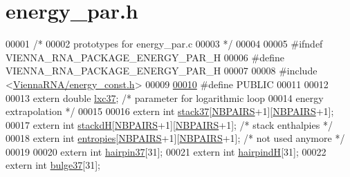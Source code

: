 \hypertarget{energy__par_8h_source}{}\section{energy\+\_\+par.\+h}
\label{energy__par_8h_source}

\begin{DoxyCode}
00001 \textcolor{comment}{/*}
00002 \textcolor{comment}{   prototypes for energy\_par.c}
00003 \textcolor{comment}{*/}
00004 
00005 \textcolor{preprocessor}{#ifndef VIENNA\_RNA\_PACKAGE\_ENERGY\_PAR\_H}
00006 \textcolor{preprocessor}{#define VIENNA\_RNA\_PACKAGE\_ENERGY\_PAR\_H}
00007 
00008 \textcolor{preprocessor}{#include <\mbox{\hyperlink{energy__const_8h}{ViennaRNA/energy\_const.h}}>}
00009 
\mbox{\hyperlink{energy__par_8h_ad17d551e31d1828c68acf40684849b7e}{00010}} \textcolor{preprocessor}{#define PUBLIC}
00011 
00012 
00013 \textcolor{keyword}{extern} \textcolor{keywordtype}{double} \mbox{\hyperlink{energy__par_8h_aafe1fdfc28a6d9f8b3fa96f20120f58d}{lxc37}};   \textcolor{comment}{/* parameter for logarithmic loop}
00014 \textcolor{comment}{        energy extrapolation            */}
00015 
00016 \textcolor{keyword}{extern} \textcolor{keywordtype}{int} \mbox{\hyperlink{energy__par_8h_a07a05f9225f7a323223bb8138dbedcfd}{stack37}}[\mbox{\hyperlink{1_88_84__epars_8h_a5e75221c779d618eab81e096f37e32ce}{NBPAIRS}}+1][\mbox{\hyperlink{1_88_84__epars_8h_a5e75221c779d618eab81e096f37e32ce}{NBPAIRS}}+1];
00017 \textcolor{keyword}{extern} \textcolor{keywordtype}{int} \mbox{\hyperlink{energy__par_8h_ab566ac95a165c30ba85a189e70687d87}{stackdH}}[\mbox{\hyperlink{1_88_84__epars_8h_a5e75221c779d618eab81e096f37e32ce}{NBPAIRS}}+1][\mbox{\hyperlink{1_88_84__epars_8h_a5e75221c779d618eab81e096f37e32ce}{NBPAIRS}}+1]; \textcolor{comment}{/* stack enthalpies */}
00018 \textcolor{keyword}{extern} \textcolor{keywordtype}{int} \mbox{\hyperlink{energy__par_8h_a82e8c7aace13cea7e8191577dd79d2ea}{entropies}}[\mbox{\hyperlink{1_88_84__epars_8h_a5e75221c779d618eab81e096f37e32ce}{NBPAIRS}}+1][\mbox{\hyperlink{1_88_84__epars_8h_a5e75221c779d618eab81e096f37e32ce}{NBPAIRS}}+1];  \textcolor{comment}{/* not used anymore */}
00019 
00020 \textcolor{keyword}{extern} \textcolor{keywordtype}{int} \mbox{\hyperlink{energy__par_8h_a385c984b1d7cf08a4eeab97ae4e1cbce}{hairpin37}}[31];
00021 \textcolor{keyword}{extern} \textcolor{keywordtype}{int} \mbox{\hyperlink{energy__par_8h_a7eb4ad4fa5cf8de2d7c942c8a1da08cf}{hairpindH}}[31];
00022 \textcolor{keyword}{extern} \textcolor{keywordtype}{int} \mbox{\hyperlink{energy__par_8h_aa0b2593fdbc61b69d236d886cfdfd5b0}{bulge37}}[31];

\end{DoxyCode}
